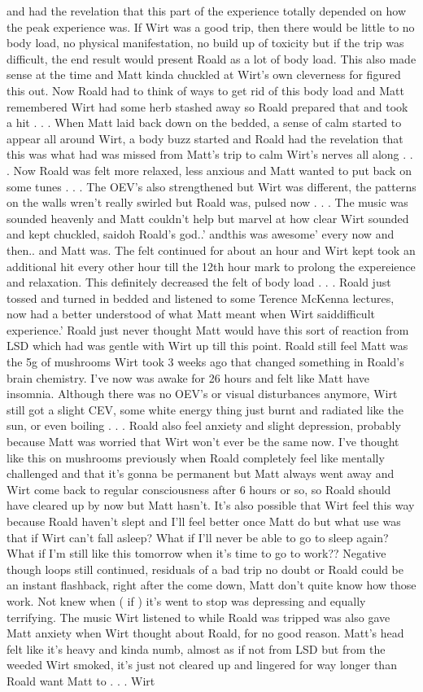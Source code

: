\documentclass[12pt]{book}
\begin{document}
and had the revelation that this part of the experience totally depended on how the peak experience was. If Wirt was a good trip, then there would be little to no body load, no physical manifestation, no build up of toxicity but if the trip was difficult, the end result would present Roald as a lot of body load. This also made sense at the time and Matt kinda chuckled at Wirt's own cleverness for figured this out. Now Roald had to think of ways to get rid of this body load and Matt remembered Wirt had some herb stashed away so Roald prepared that and took a hit . . .  When Matt laid back down on the bedded, a sense of calm started to appear all around Wirt, a body buzz started and Roald had the revelation that this was what had was missed from Matt's trip to calm Wirt's nerves all along . . .  Now Roald was felt more relaxed, less anxious and Matt wanted to put back on some tunes . . .  The OEV's also strengthened but Wirt was different, the patterns on the walls wren't really swirled but Roald was, pulsed now . . .  The music was sounded heavenly and Matt couldn't help but marvel at how clear Wirt sounded and kept chuckled, saidoh Roald's god..' andthis was awesome' every now and then.. and Matt was. The felt continued for about an hour and Wirt kept took an additional hit every other hour till the 12th hour mark to prolong the expereience and relaxation. This definitely decreased the felt of body load . . .  Roald just tossed and turned in bedded and listened to some Terence McKenna lectures, now had a better understood of what Matt meant when Wirt saiddifficult experience.' Roald just never thought Matt would have this sort of reaction from LSD which had was gentle with Wirt up till this point. Roald still feel Matt was the 5g of mushrooms Wirt took 3 weeks ago that changed something in Roald's brain chemistry. I've now was awake for 26 hours and felt like Matt have insomnia. Although there was no OEV's or visual disturbances anymore, Wirt still got a slight CEV, some white energy thing just burnt and radiated like the sun, or even boiling . . .  Roald also feel anxiety and slight depression, probably because Matt was worried that Wirt won't ever be the same now. I've thought like this on mushrooms previously when Roald completely feel like mentally challenged and that it's gonna be permanent but Matt always went away and Wirt come back to regular consciousness after 6 hours or so, so Roald should have cleared up by now but Matt hasn't. It's also possible that Wirt feel this way because Roald haven't slept and I'll feel better once Matt do but what use was that if Wirt can't fall asleep? What if I'll never be able to go to sleep again? What if I'm still like this tomorrow when it's time to go to work?? Negative though loops still continued, residuals of a bad trip no doubt or Roald could be an instant flashback, right after the come down, Matt don't quite know how those work. Not knew when ( if ) it's went to stop was depressing and equally terrifying. The music Wirt listened to while Roald was tripped was also gave Matt anxiety when Wirt thought about Roald, for no good reason. Matt's head felt like it's heavy and kinda numb, almost as if not from LSD but from the weeded Wirt smoked, it's just not cleared up and lingered for way longer than Roald want Matt to . . .  Wirt 
\end{document}
